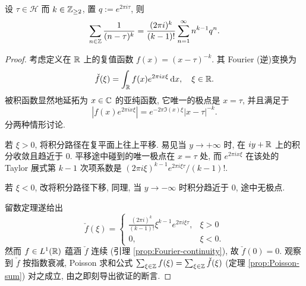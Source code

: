 \begin{lemma}\label{prop:Eisenstein-sum-lemma}
	设 $\tau \in \mathcal{H}$ 而 $k \in \mathbb{Z}_{\geq 2}$, 置 $q := e^{2\pi i\tau}$, 则
	\[ \sum_{n \in \mathbb{Z}} \frac{1}{(n-\tau)^k} = \frac{(2\pi i)^k}{(k-1)!} \sum_{n=1}^\infty n^{k-1} q^n. \]
\end{lemma}
\begin{proof}
	考虑定义在 $\mathbb{R}$ 上的复值函数 $f(x) = (x - \tau)^{-k}$. 其 Fourier (逆)变换为
	\[ \check{f}(\xi) = \int_{\mathbb{R}} f(x) e^{2\pi i x\xi} \mathop{}\!\mathrm{d} x, \quad \xi \in \mathbb{R}. \]
	被积函数显然地延拓为 $x \in \mathbb{C}$ 的亚纯函数, 它唯一的极点是 $x = \tau$, 并且满足于
	\[ \left| f(x) e^{2\pi ix\xi} \right| = e^{-2\pi \Im(x)\xi} \left| x - \tau \right|^{-k}. \]
	分两种情形讨论.
	\begin{compactenum}
		\item 若 $\xi > 0$, 将积分路径在复平面上往上平移. 易见当 $y \to +\infty$ 时, 在 $iy + \mathbb{R}$ 上的积分收敛且趋近于 $0$. 平移途中碰到的唯一极点在 $x=\tau$ 处, 而 $e^{2\pi ix\xi}$ 在该处的 Taylor 展式第 $k - 1$ 次项系数是 $(2\pi i\xi)^{k-1} e^{2\pi i\xi\tau}/(k-1)!$.
		\item 若 $\xi < 0$, 改将积分路径下移, 同理, 当 $y \to -\infty$ 时积分趋近于 $0$, 途中无极点.
	\end{compactenum}
	 留数定理遂给出
	\[ \check{f}(\xi) = \begin{cases}
		\frac{(2\pi i)^k}{(k-1)!} \xi^{k-1} e^{2\pi i\xi\tau}, & \xi > 0 \\
		0, & \xi < 0.
	\end{cases} \]
	然而 $f \in L^1(\mathbb{R})$ 蕴涵 $\check{f}$ 连续 (引理 \ref{prop:Fourier-continuity}), 故 $\check{f}(0)=0$. 观察到 $\check{f}$ 按指数衰减, Poisson 求和公式 $\sum_{\xi \in \mathbb{Z}} f(\xi) = \sum_{\xi \in \mathbb{Z}} \check{f}(\xi)$ (定理 \ref{prop:Poisson-sum}) 对之成立, 由之即刻导出欲证的断言.
\end{proof}

